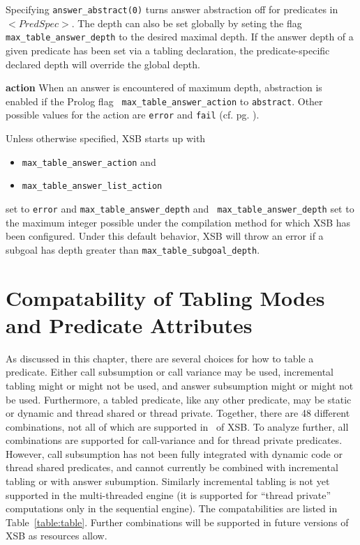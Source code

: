   Specifying {\tt answer\_abstract(0)} turns answer abstraction off
  for predicates in $<PredSpec>$.  The depth can also be set globally
  by seting the flag {\tt max\_table\_answer\_depth} to the desired
  maximal depth.  If the answer depth of a given predicate has been
  set via a tabling declaration, the predicate-specific declared depth
  will override the global depth.

\item {\bf action} When an answer is encountered of maximum depth,
  abstraction is enabled if the Prolog flag {\tt
    max\_table\_answer\_action} to {\tt abstract}.  Other possible
  values for the action are {\tt error} and {\tt fail}
  (cf. pg. \pageref{prolog-flags}).  
\ei

Unless otherwise specified, XSB starts up with 
%
\begin{itemize}
\item {\tt   max\_table\_answer\_action} and 
\item {\tt max\_table\_answer\_list\_action}
\end{itemize}
%
set to {\tt error} and {\tt max\_table\_answer\_depth} and {\tt
  max\_table\_answer\_depth} set to the maximum integer possible under
the compilation method for which XSB has been configured.  Under this
default behavior, XSB will throw an error if a subgoal has depth
greater than {\tt max\_table\_subgoal\_depth}.  %




\section{Compatability of Tabling Modes and Predicate Attributes}
%
As discussed in this chapter, there are several choices for how to
table a predicate. Either call subsumption or call variance may be
used, incremental tabling might or might not be used, and answer
subsumption might or might not be used.  Furthermore, a tabled
predicate, like any other predicate, may be static or dynamic and
thread shared or thread private.  Together, there are 48 different
combinations, not all of which are supported in \version\ of XSB.  To
analyze further, all combinations are supported for call-variance and
for thread private predicates.  However, call subsumption has not been
fully integrated with dynamic code or thread shared predicates, and
cannot currently be combined with incremental tabling or with answer
subumption.  Similarly incremental tabling is not yet supported in the
multi-threaded engine (it is supported for ``thread private''
computations only in the sequential engine).  The compatabilities are
listed in Table~\ref{table:table}.  Further combinations will be
supported in future versions of XSB as resources allow.

